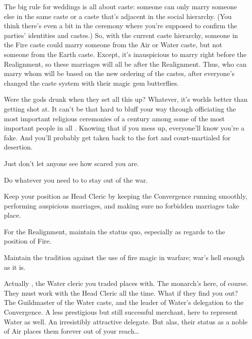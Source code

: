 \documentclass[char]{iron}
\begin{document}
The big rule for weddings is all about caste: someone can only marry
someone else in the same caste or a caste that's adjacent in the
social hierarchy.  (You think there's even a bit in the ceremony
where you're supposed to confirm the parties' identities and castes.)
So, with the current caste hierarchy, someone in
the Fire caste could marry someone from the Air or Water caste, but
not someone from the Earth caste.  Except, it's inauspicious to marry
right before the Realignment, so these marriages will all be after the
Realignment. Thus, who can marry whom will be based on the new ordering
of the castes, after everyone's changed the caste system with their
magic gem butterflies.

Were the gods drunk when they set all this up?  Whatever, it's worlds
better than getting shot at.  It can't be that hard to bluff your way
through officiating the most important religious ceremonies of a
century among some of the most important people in all
\sHomeCountry{}.  Knowing that if you mess up, everyone'll know you're
a fake.  And you'll probably get taken back to the fort and
court-martialed for desertion.

Just don't let anyone see how scared you are.

\begin{itemz}[Goals]
\item Do whatever you need to to stay out of the war.
\item Keep your position as Head Cleric by keeping the Convergence running
  smoothly, performing auspicious marriages, and making sure no forbidden
  marriages take place.
\item For the Realignment, maintain the status quo, especially as regards
  to the position of Fire.
\item Maintain the tradition against the use of fire magic in warfare;
  war's hell enough as it is.
\end{itemz}

\begin{contacts}
\contact{\cRealPriest{}}  Actually \cRealPriest{\real{\full}}, the Water cleric
  you traded places with.
\contact {\cRoyalty{}} The monarch's here, of course.  They must
  work with the Head Cleric all the time.  What if they find you out?
\contact{\cGuildmaster{}} The Guildmaster of the Water caste, and the leader of Water's delegation to the Convergence.
\contact{\cTrickster{}} A less prestigious but still successful merchant, here to represent Water as well.
\contact{\cHotPerson{}} An irresistibly attractive delegate. But alas, their status as a noble of Air places them forever out of your reach\ldots{}
\end{contacts}
\end{document}

